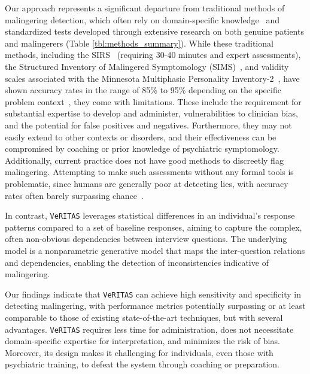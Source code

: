 \documentclass[onecolumn,10pt]{IEEEtran}
\def\vrts{\texttt{VeRITAS}\xspace}
\begin{document}
Our approach represents a significant departure from traditional methods of malingering detection, which often rely on domain-specific knowledge~\cite{walczyk2018review} and standardized tests developed through extensive research on both genuine patients and malingerers (Table \ref{tbl:methods_summary}). While these traditional methods, including the SIRS~\cite{Wong2005} (requiring 30-40 minutes and expert assessments), the Structured Inventory of Malingered Symptomology (SIMS)~\cite{smith1997detection}, and validity scales associated with the Minnesota Multiphasic Personality Inventory-2~\cite{ben2012interpreting}, have shown accuracy rates in the range of 85\% to 95\% depending on the specific problem context~\cite{rogers2008determinations,sartori2008accurately,gregg2007vying,monaro2017detection}, they come with limitations. These include the requirement for substantial expertise to develop and administer, vulnerabilities to clinician bias, and the potential for false positives and negatives. Furthermore, they may not easily extend to other contexts or disorders, and their effectiveness can be compromised by coaching or prior knowledge of psychiatric symptomology.
Additionally, current practice does not have good methods to discreetly flag malingering. Attempting to make such assessments without any formal tools is problematic, since humans are 
generally poor at detecting lies, with accuracy rates often barely surpassing chance~\cite{ekman1991who}.


In contrast, \vrts leverages statistical  differences in an individual's response patterns compared to a set of baseline responses, aiming to capture the complex, often non-obvious dependencies between interview questions. The underlying model is a  nonparametric generative model that maps the inter-question relations and dependencies, enabling the detection of inconsistencies indicative of malingering. 

Our findings indicate that \vrts can achieve high sensitivity and specificity in detecting malingering, with performance metrics potentially surpassing or at least comparable to those of existing state-of-the-art techniques, but with several advantages. \vrts requires less time for administration, does not necessitate domain-specific expertise for interpretation, and minimizes the risk of bias. Moreover, its design makes it challenging for individuals, even those with psychiatric training, to defeat the system through coaching or preparation.
\end{document}
